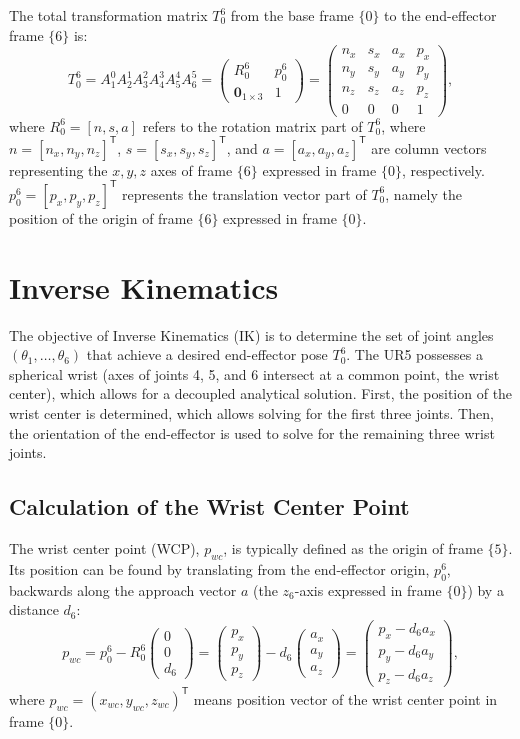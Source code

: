 \documentclass{article}
\newcommand{\mat}[1]{\begin{pmatrix} #1 \end{pmatrix}}
\newcommand{\T}{^\mathsf{T}}
\begin{document}
The total transformation matrix $T_0^6$ from the base frame $\{0\}$ to the end-effector frame $\{6\}$ is:
\begin{equation}
T_0^6 = A_1^0 A_2^1 A_3^2 A_4^3 A_5^4 A_6^5 = \mat{R_0^6 & p_0^6 \\ \mathbf{0}_{1 \times 3} & 1} = \mat{n_x & s_x & a_x & p_x \\ n_y & s_y & a_y & p_y \\ n_z & s_z & a_z & p_z \\ 0 & 0 & 0 & 1},
\end{equation}
where $R_0^6 = [n, s, a]$ refers to the rotation matrix part of $T_0^6$, where $n=[n_x,n_y,n_z]\T$, $s=[s_x,s_y,s_z]\T$, and $a=[a_x,a_y,a_z]\T$ are column vectors representing the $x, y, z$ axes of frame $\{6\}$ expressed in frame $\{0\}$, respectively.
$p_0^6 = [p_x, p_y, p_z]\T$ represents the translation vector part of $T_0^6$, namely the position of the origin of frame $\{6\}$ expressed in frame $\{0\}$.

\section{Inverse Kinematics}
The objective of Inverse Kinematics (IK) is to determine the set of joint angles $(\theta_1, \dots, \theta_6)$ that achieve a desired end-effector pose $T_0^6$. The UR5 possesses a spherical wrist (axes of joints 4, 5, and 6 intersect at a common point, the wrist center), which allows for a decoupled analytical solution. First, the position of the wrist center is determined, which allows solving for the first three joints. Then, the orientation of the end-effector is used to solve for the remaining three wrist joints.

\subsection{Calculation of the Wrist Center Point}
The wrist center point (WCP), $p_{wc}$, is typically defined as the origin of frame $\{5\}$. Its position can be found by translating from the end-effector origin, $p_0^6$, backwards along the approach vector $a$ (the $z_6$-axis expressed in frame $\{0\}$) by a distance $d_6$:
\begin{equation}
p_{wc} = p_0^6 - R_0^6 \mat{0 \\ 0 \\ d_6} = \mat{p_x \\ p_y \\ p_z} - d_6 \mat{a_x \\ a_y \\ a_z} = \mat{p_x - d_6 a_x \\ p_y - d_6 a_y \\ p_z - d_6 a_z},
\end{equation}
where $p_{wc} = (x_{wc}, y_{wc}, z_{wc})\T$ means position vector of the wrist center point in frame $\{0\}$.
\end{document}
